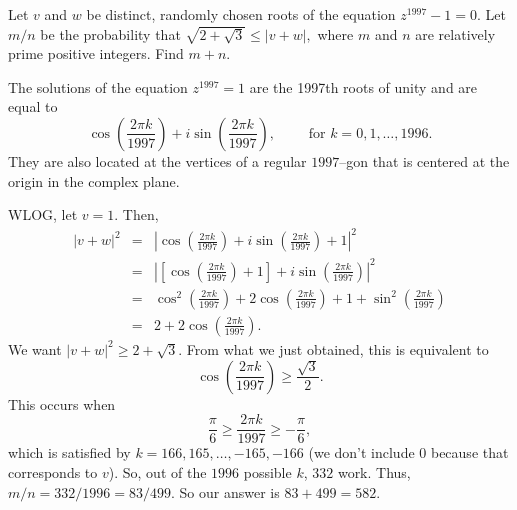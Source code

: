 %	













\begin{question}[name={1997 AIME, \href{https://artofproblemsolving.com/community/c4p393661}{Problem 14}}]
	Let $v$ and $w$ be distinct, randomly chosen roots of the equation $z^{1997}-1=0.$ Let $m/n$ be the probability that $\sqrt{2+\sqrt{3}}\le |v+w|,$ where $m$ and $n$ are relatively prime positive integers. Find $m+n.$	
\end{question}


\begin{solution}[name={Solution by joml88}]
	The solutions of the equation $z^{1997}=1$ are the 1997th roots of unity and are equal to $$\cos\left(\frac{2\pi k}{1997}\right)+i\sin\left(\frac{2\pi k}{1997}\right),\qquad \text{ for } k=0,1,\dots,1996.$$ They are also located at the vertices of a regular $1997$--gon that is centered at the origin in the complex plane.
	
	WLOG, let $v=1.$ Then,
	\begin{eqnarray*} |v+w|^2 &=& |\cos\left(\frac{2\pi k}{1997}\right)+i\sin\left(\frac{2\pi k}{1997}\right)+1|^2\\ &=& \left|\left[\cos\left(\frac{2\pi k}{1997}\right)+1\right]+i\sin\left(\frac{2\pi k}{1997}\right)\right|^2\\ &=& \cos^2\left(\frac{2\pi k}{1997}\right)+2\cos\left(\frac{2\pi k}{1997}\right)+1+\sin^2\left(\frac{2\pi k}{1997}\right)\\ &=& 2+2\cos\left(\frac{2\pi k}{1997}\right). \end{eqnarray*}
	We want $|v+w|^2\ge 2+\sqrt{3}$. From what we just obtained, this is equivalent to $$\cos\left(\frac{2\pi k}{1997}\right)\ge \frac{\sqrt{3}}2.$$ This occurs when $$\frac{\pi}6\ge \frac{2\pi k}{1997}\ge -\frac{\pi}6,$$ which is satisfied by $k=166,165,\ldots,-165,-166$ (we don't include $0$ because that corresponds to $v$). So, out of the $1996$ possible $k$, $332$ work. Thus, $m/n=332/1996=83/499.$ So our answer is $83+499=\boxed{582}$.
\end{solution}







